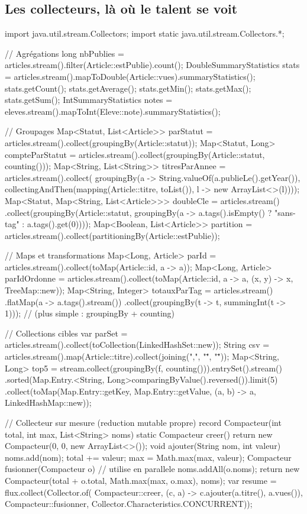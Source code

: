 \subsection{Les collecteurs, l\`a o\`u le talent se voit}

\begin{codejava}
import java.util.stream.Collectors;
import static java.util.stream.Collectors.*;

// Agr\'egations
long nbPublies = articles.stream().filter(Article::estPublie).count();
DoubleSummaryStatistics stats = articles.stream().mapToDouble(Article::vues).summaryStatistics();
stats.getCount(); stats.getAverage(); stats.getMin(); stats.getMax(); stats.getSum();
IntSummaryStatistics notes = eleves.stream().mapToInt(Eleve::note).summaryStatistics();

// Groupages
Map<Statut, List<Article>> parStatut = articles.stream().collect(groupingBy(Article::statut));
Map<Statut, Long> compteParStatut = articles.stream().collect(groupingBy(Article::statut, counting()));
Map<String, List<String>> titresParAnnee = articles.stream().collect(
        groupingBy(a -> String.valueOf(a.publieLe().getYear()),
                   collectingAndThen(mapping(Article::titre, toList()), l -> new ArrayList<>(l))));
Map<Statut, Map<String, List<Article>>> doubleCle = articles.stream()
        .collect(groupingBy(Article::statut, groupingBy(a -> a.tags().isEmpty() ? "sans-tag" : a.tags().get(0))));
Map<Boolean, List<Article>> partition = articles.stream().collect(partitioningBy(Article::estPublie));

// Maps et transformations
Map<Long, Article> parId = articles.stream().collect(toMap(Article::id, a -> a));
Map<Long, Article> parIdOrdonne = articles.stream().collect(toMap(Article::id, a -> a, (x, y) -> x, TreeMap::new));
Map<String, Integer> totauxParTag = articles.stream()
        .flatMap(a -> a.tags().stream())
        .collect(groupingBy(t -> t, summingInt(t -> 1)));
// (plus simple : groupingBy + counting)

// Collections cibles
var parSet = articles.stream().collect(toCollection(LinkedHashSet::new));
String csv = articles.stream().map(Article::titre).collect(joining(",", "\"", "\""));
Map<String, Long> top5 = stream.collect(groupingBy(f, counting())).entrySet().stream()
        .sorted(Map.Entry.<String, Long>comparingByValue().reversed()).limit(5)
        .collect(toMap(Map.Entry::getKey, Map.Entry::getValue, (a, b) -> a, LinkedHashMap::new));

// Collecteur sur mesure (reduction mutable propre)
record Compacteur(int total, int max, List<String> noms) {
    static Compacteur creer() { return new Compacteur(0, 0, new ArrayList<>()); }
    void ajouter(String nom, int valeur) { noms.add(nom); total += valeur; max = Math.max(max, valeur); }
    Compacteur fusionner(Compacteur o) {   // utilise en parallele
        noms.addAll(o.noms); return new Compacteur(total + o.total, Math.max(max, o.max), noms);
    }
}
var resume = flux.collect(Collector.of(
        Compacteur::creer,
        (c, a) -> c.ajouter(a.titre(), a.vues()),
        Compacteur::fusionner,
        Collector.Characteristics.CONCURRENT));


\end{codejava}
